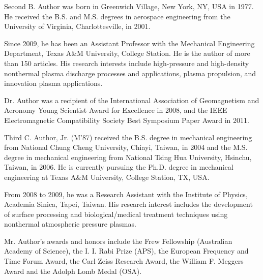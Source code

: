 \documentclass{ieeeojies}
\begin{document}
\begin{IEEEbiography}{Second B. Author} was born in Greenwich Village, New York, NY, USA in 
1977. He received the B.S. and M.S. degrees in aerospace engineering from 
the University of Virginia, Charlottesville, in 2001.

Since 2009, he has been an Assistant Professor with the 
Mechanical Engineering Department, Texas A{\&}M University, College Station. 
He is the author of more than 150 articles. His research interests include high-pressure and high-density nonthermal plasma discharge processes and applications, plasma propulsion, and innovation plasma applications.

Dr. Author was a recipient of the International Association of Geomagnetism 
and Aeronomy Young Scientist Award for Excellence in 2008, and the IEEE 
Electromagnetic Compatibility Society Best Symposium Paper Award in 2011. 
\end{IEEEbiography}

\begin{IEEEbiography}{Third C. Author, Jr.} (M'87) received the B.S. degree in mechanical 
engineering from National Chung Cheng University, Chiayi, Taiwan, in 2004 
and the M.S. degree in mechanical engineering from National Tsing Hua 
University, Hsinchu, Taiwan, in 2006. He is currently pursuing the Ph.D. 
degree in mechanical engineering at Texas A{\&}M University, College 
Station, TX, USA.

From 2008 to 2009, he was a Research Assistant with the Institute of 
Physics, Academia Sinica, Tapei, Taiwan. His research interest includes the 
development of surface processing and biological/medical treatment 
techniques using nonthermal atmospheric pressure plasmas. 

Mr. Author's awards and honors include the Frew Fellowship (Australian 
Academy of Science), the I. I. Rabi Prize (APS), the European Frequency and 
Time Forum Award, the Carl Zeiss Research Award, the William F. Meggers 
Award and the Adolph Lomb Medal (OSA).
\end{IEEEbiography}

\EOD
\end{document}

